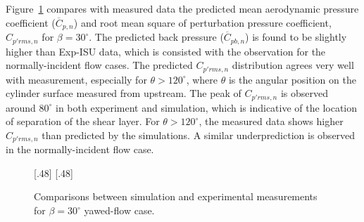 Figure~\ref{fig:Cp_Compared_Yawed_Exp-ISU} compares with measured data the
predicted mean aerodynamic pressure coefficient ($\overline{C}_{p,n}$) and root
mean square of perturbation pressure coefficient, $C_{p'rms,n}$ for
$\beta=30^\circ$. The predicted back pressure ($\overline{C}_{pb,n}$) is found
to be slightly higher than Exp-ISU data, which is consisted with the
observation for the normally-incident flow cases. The predicted $C_{p'rms,n}$
distribution agrees very well with measurement, especially for
$\theta>120^\circ$, where $\theta$ is the angular position on the cylinder
surface measured from upstream. The peak of $C_{p'rms,n}$ is observed around
$80^\circ$ in both experiment and simulation, which is indicative of the
location of separation of the shear layer. For $\theta > 120^\circ$, the
measured data shows higher $C_{p'rms,n}$ than predicted by the simulations. A
similar underprediction is observed in the normally-incident flow case.
%
\begin{figure}[htb!]
  \centering
    [.48\linewidth]{}
  \hspace*{\fill}
    [.48\linewidth]{}
  \caption{Comparisons between simulation and experimental measurements for
    $\beta=30^\circ$ yawed-flow case.}
\label{fig:Cp_Compared_Yawed_Exp-ISU}
\end{figure}

